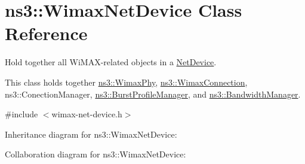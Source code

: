 \hypertarget{classns3_1_1WimaxNetDevice}{}\section{ns3\+:\+:Wimax\+Net\+Device Class Reference}
\label{classns3_1_1WimaxNetDevice}


Hold together all Wi\+M\+A\+X-\/related objects in a \hyperlink{classns3_1_1NetDevice}{Net\+Device}.

This class holds together \hyperlink{classns3_1_1WimaxPhy}{ns3\+::\+Wimax\+Phy}, \hyperlink{classns3_1_1WimaxConnection}{ns3\+::\+Wimax\+Connection}, ns3\+::\+Conection\+Manager, \hyperlink{classns3_1_1BurstProfileManager}{ns3\+::\+Burst\+Profile\+Manager}, and \hyperlink{classns3_1_1BandwidthManager}{ns3\+::\+Bandwidth\+Manager}.  




{\ttfamily \#include $<$wimax-\/net-\/device.\+h$>$}



Inheritance diagram for ns3\+:\+:Wimax\+Net\+Device\+:


Collaboration diagram for ns3\+:\+:Wimax\+Net\+Device\+:
